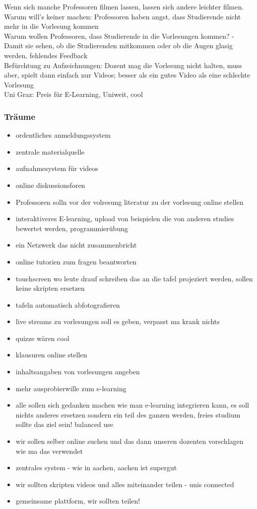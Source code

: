 \begin{itemize}
		Wenn sich manche Professoren filmen lassen, lassen sich andere leichter filmen. \\
		Warum will's keiner machen: Professoren haben angst, dass Studierende nicht mehr in die Vorlesung kommen \\
		Warum wollen Professoren, dass Studierende in die Vorlesungen kommen? - Damit sie sehen, ob die Studierenden mitkommen oder ob die Augen glasig werden, fehlendes Feedback\\

		Befürchtung zu Aufzeichnungen: Dozent mag die Vorlesung nicht halten, muss aber, spielt dann einfach nur Videos;
		besser als ein gutes Video als eine schlechte Vorlesung\\

		Uni Graz: Preis für E-Learning, Uniweit, cool

\subsubsection{Träume}
	\begin{itemize}
		\item ordentliches anmeldungssystem
		\item zentrale materialquelle
		\item aufnahmesystem für videos
		\item online diskussionsforen
		\item Professoren solln vor der volresung literatur zu der vorlesung online stellen
		\item interaktiveres E-learning, upload von beispielen die von anderen studies bewertet werden, programmierübung
		\item ein Netzwerk das nicht zusammenbricht
		\item online tutorien zum fragen beantworten
		\item touchscreen wo leute drauf schreiben das an die tafel projeziert werden, sollen keine skripten ersetzen
		\item tafeln automatisch abfotografieren
		\item live streams zu vorlesungen soll es geben, verpasst ma krank nichts
		\item quizze wären cool
		\item klausuren online stellen
		\item inhaltsangaben von vorlesungen angeben
		\item mehr ausprobierwille zum e-learning
		\item alle sollen sich gedanken machen wie man e-learning integrieren kann, es soll nichts anderes ersetzen sondern ein teil des ganzen werden, freies studium sollte das ziel sein! balanced use
		\item wir sollen selber online suchen und das dann unseren dozenten vorschlagen wie ma das verwendet
		\item zentrales system - wie in aachen, aachen ist supergut
		\item wir sollten skripten videos und alles miteinander teilen - unis connected
		\item gemeinsame plattform, wir sollten teilen!
	\end{itemize}


\end{itemize}
